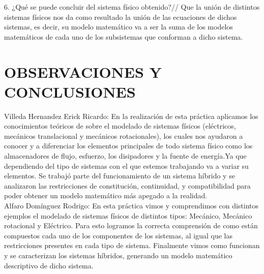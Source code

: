 6. ¿Qué se puede concluir del sistema físico obtenido?//
Que la unión de distintos sistemas físicos nos da como resultado la unión de las ecuaciones de dichos sistemas, es decir, su modelo matemático va a ser la suma de los modelos matemáticos de cada uno de los subsistemas que conforman a dicho sistema.

\section{OBSERVACIONES Y CONCLUSIONES}

	Villeda Hernandez Erick Ricardo: En la realización de esta práctica aplicamos los conocimientos teóricos de sobre el modelado de sistemas físicos (eléctricos, mecánicos translacional y mecánicos rotacionales), los cuales nos ayudaron a conocer y a diferenciar los elementos principales de todo sistema físico como los almacenadores de flujo, esfuerzo, los disipadores y la fuente de energía.Ya que dependiendo del tipo de sistemas con el que estemos trabajando va a variar su elementos. Se trabajó parte del funcionamiento de un sistema híbrido y se analizaron  las restricciones de constitución, continuidad, y compatibilidad para poder obtener un modelo matemático más apegado a la realidad.\\
Alfaro Domínguez Rodrigo: En esta práctica vimos y comprendimos con distintos ejemplos el modelado de sistemas físicos de distintos tipos: Mecánico, Mecánico rotacional y Eléctrico. Para esto logramos la correcta comprensión de como están compuestos cada uno de los componentes de los sistemas, al igual que las restricciones presentes en cada tipo de sistema. Finalmente vimos como funcionan y se caracterizan los sistemas híbridos, generando un modelo matemático descriptivo de dicho sistema.